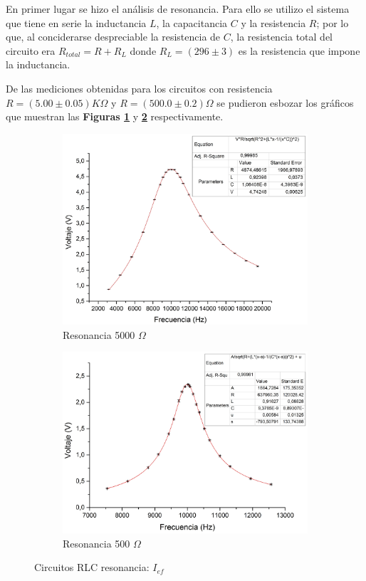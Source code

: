 \documentclass[11pt,a4paper]{article}
\begin{document}
En primer lugar se hizo el análisis de resonancia. Para ello se utilizo el sistema que tiene en serie la inductancia $L$, la capacitancia $C$ y la resistencia $R$; por lo que, al conciderarse despreciable la resistencia de $C$, la resistencia total del circuito era $R_{total} = R+R_{L}$ donde $R_{L} = (296 \pm 3)$ es la resistencia que impone la inductancia.

De las mediciones obtenidas para los circuitos con resistencia $R=(5.00 \pm 0.05)K\Omega$ y $R=(500.0 \pm 0.2)\Omega$ se pudieron esbozar los gráficos que muestran las \textbf{Figuras \ref{subfig:RES_I.a}} y \textbf{\ref{subfig:RES_I.b}} respectivamente.

\begin{figure}[h]

\begin{subfigure}{0.5\textwidth}
\includegraphics[scale=0.3]{RLC_RES_5000_VvsF}
  \caption{Resonancia 5000 $\Omega$}
  \label{subfig:RES_I.a}
\end{subfigure}
\begin{subfigure}{0.5\textwidth}
\includegraphics[scale=0.32]{RLC_RES_500_VvsF}
  \caption{Resonancia 500 $\Omega$}
  \label{subfig:RES_I.b}
\end{subfigure}
  \caption{Circuitos RLC resonancia: $I_{ef}$}
  \label{fig:RES_I}
\end{figure}
\end{document}
